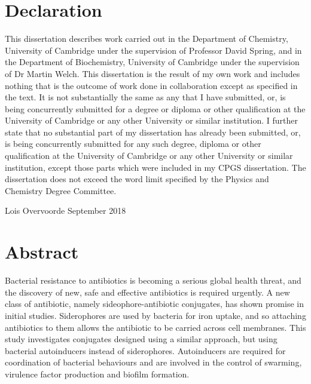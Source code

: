 \newpage

\section{Declaration}

This dissertation describes work carried out in the Department of Chemistry, University of Cambridge under the supervision of Professor David Spring, and in the Department of Biochemistry, University of Cambridge under the supervision of Dr Martin Welch. 
This dissertation is the result of my own work and includes nothing that is the outcome of work done in collaboration except as specified in the text. 
It is not substantially the same as any that I have submitted, or, is being concurrently submitted for a degree or diploma or other qualification at the University of Cambridge or any other University or similar institution. 
I further state that no substantial part of my dissertation has already been submitted, or, is being concurrently submitted for any such degree, diploma or other qualification at the University of Cambridge or any other University or similar institution, except those parts which were included in my CPGS dissertation.
The dissertation does not exceed the word limit specified by the Physics and Chemistry Degree Committee.








\vspace{5cm}



Lois Overvoorde
September 2018

\newpage

\section{Abstract}

Bacterial resistance to antibiotics is becoming a serious global health threat, and the discovery of new, safe and effective antibiotics is required urgently\cite{ResistanceUS,davies2013drugs,ANIE:ANIE201209979}. A new class of antibiotic, namely sideophore-antibiotic conjugates, has shown promise in initial studies\cite{Page2013,Schalk2017}. Siderophores are used by bacteria for iron uptake, and so attaching antibiotics to them allows the antibiotic to be carried across cell membranes. This study investigates conjugates designed using a similar approach, but using bacterial autoinducers\cite{Waters2005} instead of siderophores. Autoinducers are required for coordination of bacterial behaviours and are involved in the control of swarming, virulence factor production and biofilm formation\cite{Miller2001}. 


